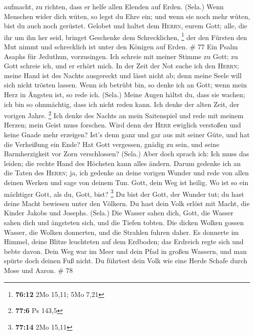 aufmacht, zu richten, dass er helfe allen Elenden auf Erden. (Sela.)
 Wenn Menschen wider dich wüten, so legst du Ehre ein;
und wenn sie noch mehr wüten, bist du auch noch gerüstet.
 Gelobet und haltet dem \textsc{Herrn}, eurem Gott; alle,
die ihr um ihn her seid, bringet Geschenke dem Schrecklichen,
\footnote{\textbf{76:12} 2Mo 15,11; 5Mo 7,21}  der den
Fürsten den Mut nimmt und schrecklich ist unter den Königen auf Erden.
\# 77  Ein Psalm Asaphs für Jeduthun, vorzusingen.
 Ich schreie mit meiner Stimme zu Gott; zu Gott schreie
ich, und er erhört mich.  In der Zeit der Not suche ich
den \textsc{Herrn}; meine Hand ist des Nachts ausgereckt und lässt nicht
ab; denn meine Seele will sich nicht trösten lassen.  Wenn
ich betrübt bin, so denke ich an Gott; wenn mein Herz in Ängsten ist, so
rede ich. (Sela.)  Meine Augen hältst du, dass sie wachen;
ich bin so ohnmächtig, dass ich nicht reden kann.  Ich
denke der alten Zeit, der vorigen Jahre. \footnote{\textbf{77:6} Ps
  143,5}  Ich denke des Nachts an mein Saitenspiel und
rede mit meinem Herzen; mein Geist muss forschen.  Wird
denn der \textsc{Herr} ewiglich verstoßen und keine Gnade mehr erzeigen?
 Ist's denn ganz und gar aus mit seiner Güte, und hat die
Verheißung ein Ende?  Hat Gott vergessen, gnädig zu sein,
und seine Barmherzigkeit vor Zorn verschlossen? (Sela.) 
Aber doch sprach ich: Ich muss das leiden; die rechte Hand des Höchsten
kann alles ändern.  Darum gedenke ich an die Taten des
\textsc{Herrn}; ja, ich gedenke an deine vorigen Wunder 
und rede von allen deinen Werken und sage von deinem Tun.
 Gott, dein Weg ist heilig. Wo ist so ein mächtiger Gott,
als du, Gott, bist? \footnote{\textbf{77:14} 2Mo 15,11} 
Du bist der Gott, der Wunder tut; du hast deine Macht bewiesen unter den
Völkern.  Du hast dein Volk erlöst mit Macht, die Kinder
Jakobs und Josephs. (Sela.)  Die Wasser sahen dich, Gott,
die Wasser sahen dich und ängsteten sich, und die Tiefen tobten.
 Die dicken Wolken gossen Wasser, die Wolken donnerten,
und die Strahlen fuhren daher.  Es donnerte im Himmel,
deine Blitze leuchteten auf dem Erdboden; das Erdreich regte sich und
bebte davon.  Dein Weg war im Meer und dein Pfad in
großen Wassern, und man spürte doch deinen Fuß nicht.  Du
führtest dein Volk wie eine Herde Schafe durch Mose und Aaron. \# 78
